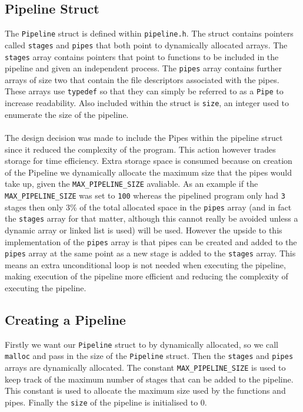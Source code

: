 \documentclass{article}
\begin{document}
    \subsection{Pipeline Struct}
    The \verb+Pipeline+ struct is defined within \verb+pipeline.h+.
    The struct contains pointers called \verb+stages+ and \verb+pipes+ that both point to dynamically allocated arrays.
    The \verb+stages+ array contains pointers that point to functions to be included in the pipeline and given an independent process.
    The \verb+pipes+ array contains further arrays of size two that contain the file descriptors associated with the pipes.
    These arrays use \verb+typedef+ so that they can simply be referred to as a \verb+Pipe+ to increase readability.
    Also included within the struct is \verb+size+, an integer used to enumerate the size of the pipeline.
    \\ \\ The design decision was made to include the Pipes within the pipeline struct since it reduced the complexity of the program.
    This action however trades storage for time efficiency.
    Extra storage space is consumed because on creation of the Pipeline we dynamically allocate the maximum size that the pipes would take up, given the \verb+MAX_PIPELINE_SIZE+ avaliable.
    As an example if the \verb+MAX_PIPELINE_SIZE+ was set to \verb+100+ whereas the pipelined program only had \verb+3+ stages then only 3\% of the total allocated space in the \verb+pipes+ array (and in fact the \verb+stages+ array for that matter, although this cannot really be avoided unless a dynamic array or linked list is used) will be used.
    However the upside to this implementation of the \verb+pipes+ array is that pipes can be created and added to the \verb+pipes+ array at the same point as a new stage is added to the \verb+stages+ array.
    This means an extra unconditional loop is not needed when executing the pipeline, making execution of the pipeline more efficient and reducing the complexity of executing the pipeline.

    \subsection{Creating a Pipeline}
    Firstly we want our \verb+Pipeline+ struct to by dynamically allocated, so we call \verb+malloc+ and pass in the size of the \verb+Pipeline+ struct.
    Then the \verb+stages+ and \verb+pipes+ arrays are dynamically allocated.
    The constant \verb+MAX_PIPELINE_SIZE+ is used to keep track of the maximum number of stages that can be added to the pipeline.
    This constant is used to allocate the maximum size used by the functions and pipes.
    Finally the \verb+size+ of the pipeline is initialised to 0.
    
\end{document}
